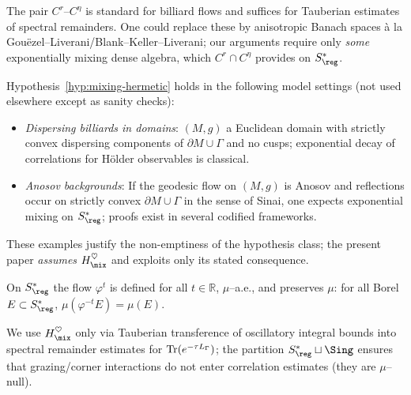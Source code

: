 \begin{hypothesis}
\begin{remark}\label{rem:anisotropic}
The pair $C^r$–$C^\eta$ is standard for billiard flows and suffices for Tauberian estimates of spectral remainders.
One could replace these by anisotropic Banach spaces à la Gouëzel–Liverani/Blank–Keller–Liverani; our arguments require only \emph{some} exponentially mixing dense algebra, which $C^r\cap C^\eta$ provides on $S^*_{\reg}$.
\end{remark}

\begin{remark}\label{rem:sufficient-geom}
Hypothesis~\ref{hyp:mixing-hermetic} holds in the following model settings (not used elsewhere except as sanity checks):
\begin{itemize}
\item \emph{Dispersing billiards in domains}: $(M,g)$ a Euclidean domain with strictly convex dispersing components of $\partial M\cup\Gamma$ and no cusps; exponential decay of correlations for Hölder observables is classical.
\item \emph{Anosov backgrounds}: If the geodesic flow on $(M,g)$ is Anosov and reflections occur on strictly convex $\partial M\cup\Gamma$ in the sense of Sinai, one expects exponential mixing on $S^*_{\reg}$; proofs exist in several codified frameworks.
\end{itemize}
These examples justify the non-emptiness of the hypothesis class; the present paper \emph{assumes} $H_{\mix}^{\heartsuit}$ and exploits only its stated consequence.
\end{remark}

\begin{lemma}\label{lem:liouville}
On $S^*_{\reg}$ the flow $\varphi^t$ is defined for all $t\in\mathbb{R}$, $\mu$–a.e., and preserves $\mu$: for all Borel $E\subset S^*_{\reg}$, $\mu(\varphi^{-t}E)=\mu(E)$.
\end{lemma}

\begin{remark}\label{rem:tauberian-interface}
We use $H_{\mix}^{\heartsuit}$ only via Tauberian transference of oscillatory integral bounds into spectral remainder estimates for $\operatorname{Tr}(e^{-\tau L_\Gamma})$; the partition $S^*_{\reg}\sqcup\Sing$ ensures that grazing/corner interactions do not enter correlation estimates (they are $\mu$–null).
\end{remark}


\end{hypothesis}
